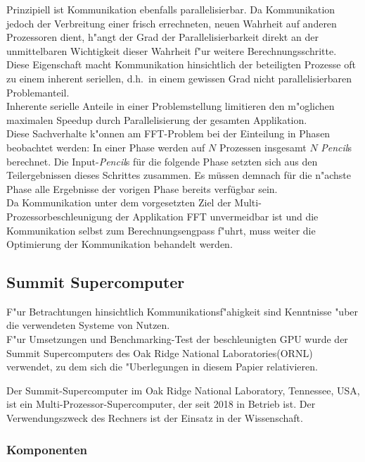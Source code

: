 Prinzipiell ist Kommunikation ebenfalls parallelisierbar. Da Kommunikation jedoch der Verbreitung einer frisch errechneten, neuen Wahrheit auf anderen Prozessoren dient, h"angt der Grad der Parallelisierbarkeit direkt an der unmittelbaren Wichtigkeit dieser Wahrheit f"ur weitere Berechnungsschritte.\\
Diese Eigenschaft macht Kommunikation hinsichtlich der beteiligten Prozesse oft zu einem inherent seriellen, d.h.~in einem gewissen Grad nicht parallelisierbaren Problemanteil.\\
Inherente serielle Anteile in einer Problemstellung limitieren den m"oglichen maximalen Speedup durch Parallelisierung der gesamten Applikation.\\
Diese Sachverhalte k"onnen am FFT-Problem bei der Einteilung in Phasen beobachtet werden: In einer Phase werden auf $N$ Prozessen insgesamt $N$ \textit{Pencil}s berechnet. Die Input-\textit{Pencil}s für die folgende Phase setzten sich aus den Teilergebnissen dieses Schrittes zusammen. Es müssen demnach für die n"achste Phase alle Ergebnisse der vorigen Phase bereits verfügbar sein.\\
Da Kommunikation unter dem vorgesetzten Ziel der Multi-Prozessorbeschleunigung der Applikation FFT unvermeidbar ist und die Kommunikation selbst zum Berechnungsengpass f"uhrt, muss weiter die Optimierung der Kommunikation behandelt werden.


\subsection{Summit Supercomputer}
F"ur Betrachtungen hinsichtlich Kommunikationsf"ahigkeit sind Kenntnisse "uber die verwendeten Systeme von Nutzen.\\
F"ur Umsetzungen und Benchmarking-Test der beschleunigten GPU wurde der Summit Supercomputers des Oak Ridge National Laboratories(ORNL) verwendet, zu dem sich die "Uberlegungen in diesem Papier relativieren.

Der Summit-Supercomputer im Oak Ridge National Laboratory, Tennessee, USA, ist ein Multi-Prozessor-Supercomputer, der seit 2018 in Betrieb ist. Der Verwendungszweck des Rechners ist der Einsatz in der Wissenschaft.

\subsubsection{Komponenten}

